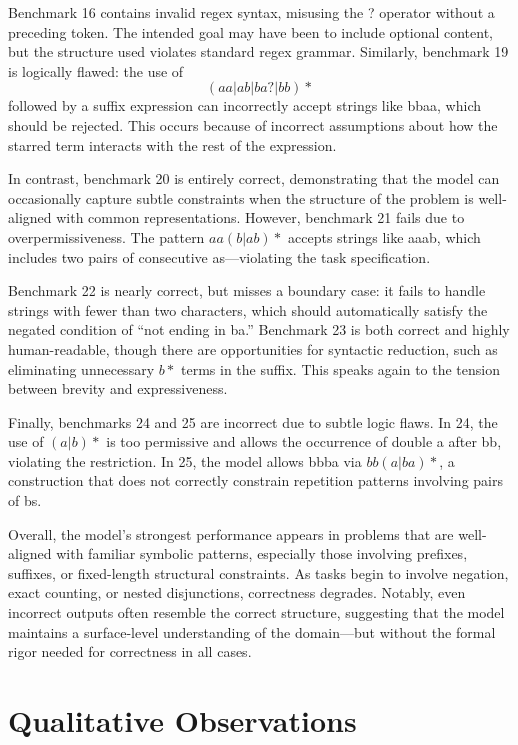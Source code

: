 \indent\indent Benchmark 16 contains invalid regex syntax, misusing the ? operator without a preceding token. The intended goal may have been to include optional content, but the structure used violates standard regex grammar. Similarly, benchmark 19 is logically flawed: the use of $$(aa|ab|ba?|bb)*$$ followed by a suffix expression can incorrectly accept strings like bbaa, which should be rejected. This occurs because of incorrect assumptions about how the starred term interacts with the rest of the expression.

\indent\indent In contrast, benchmark 20 is entirely correct, demonstrating that the model can occasionally capture subtle constraints when the structure of the problem is well-aligned with common representations. However, benchmark 21 fails due to overpermissiveness. The pattern $aa(b|ab)*$ accepts strings like aaab, which includes two pairs of consecutive as—violating the task specification.

\indent\indent Benchmark 22 is nearly correct, but misses a boundary case: it fails to handle strings with fewer than two characters, which should automatically satisfy the negated condition of “not ending in ba.” Benchmark 23 is both correct and highly human-readable, though there are opportunities for syntactic reduction, such as eliminating unnecessary $b*$ terms in the suffix. This speaks again to the tension between brevity and expressiveness.

\indent\indent Finally, benchmarks 24 and 25 are incorrect due to subtle logic flaws. In 24, the use of $(a|b)*$ is too permissive and allows the occurrence of double a after bb, violating the restriction. In 25, the model allows bbba via $bb(a|ba)*$, a construction that does not correctly constrain repetition patterns involving pairs of bs.

\indent\indent Overall, the model's strongest performance appears in problems that are well-aligned with familiar symbolic patterns, especially those involving prefixes, suffixes, or fixed-length structural constraints. As tasks begin to involve negation, exact counting, or nested disjunctions, correctness degrades. Notably, even incorrect outputs often resemble the correct structure, suggesting that the model maintains a surface-level understanding of the domain—but without the formal rigor needed for correctness in all cases.
\section{Qualitative Observations}

